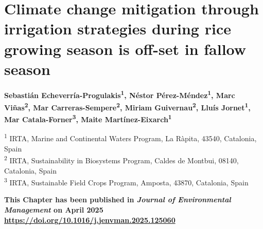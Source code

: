 \def\Plus{\texttt{+}} %

\chapter{Climate change mitigation through irrigation strategies during rice growing season is off-set in fallow season}
\label{Chapter2}

\begin{center}
\textbf{
Sebastián Echeverría-Progulakis\textsuperscript{1},
Néstor Pérez-Méndez\textsuperscript{1},
Marc Viñas\textsuperscript{2},
Mar Carreras-Sempere\textsuperscript{2},
Miriam Guivernau\textsuperscript{2},
Lluís Jornet\textsuperscript{1},
Mar Catala-Forner\textsuperscript{3},
Maite Martínez-Eixarch\textsuperscript{1}
}
\end{center}

\vspace{1ex}

\begin{center}
\textsuperscript{1} IRTA, Marine and Continental Waters Program, La Ràpita, 43540, Catalonia, Spain \\
\textsuperscript{2} IRTA, Sustainability in Biosystems Program, Caldes de Montbui, 08140, Catalonia, Spain\\
\textsuperscript{3} IRTA, Sustainable Field Crops Program, Amposta, 43870, Catalonia, Spain  \\
\end{center}

\begin{center}
{\footnotesize  
\textbf{This Chapter has been published in \textit{Journal of Environmental Management} on April 2025\\
\color{blue}\url{https://doi.org/10.1016/j.jenvman.2025.125060}}}
\end{center}

